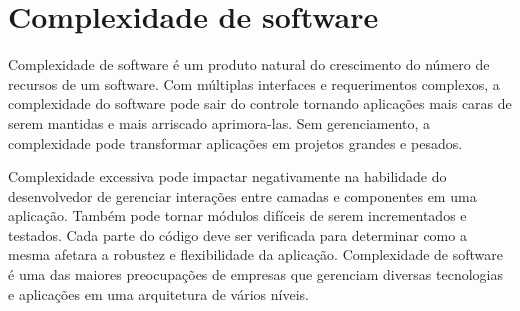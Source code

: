 %
%
%
%
%

\section{Complexidade de software}

Complexidade de software é um produto natural do crescimento do número de recursos de um software. Com múltiplas interfaces e requerimentos complexos, a complexidade do software pode sair do controle tornando aplicações mais caras de serem mantidas e mais arriscado aprimora-las. Sem gerenciamento, a complexidade pode transformar aplicações em projetos grandes e pesados.

Complexidade excessiva pode impactar negativamente na habilidade do desenvolvedor de gerenciar interações entre camadas e componentes em uma aplicação. Também pode tornar módulos difíceis de serem incrementados e testados. Cada parte do código deve ser verificada para determinar como a mesma afetara a robustez e flexibilidade da aplicação. Complexidade de software é uma das maiores preocupações de empresas que gerenciam diversas tecnologias e aplicações em uma arquitetura de vários níveis.

